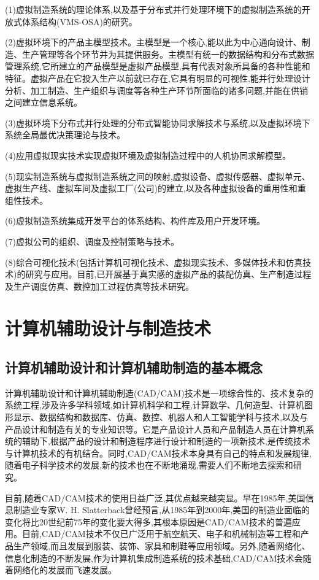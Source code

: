 \documentclass[UTF8]{ctexbook}
\newcommand{\◎}{\ensuremath{\bigcirc}}
\begin{document}
(1)虚拟制造系统的理论体系,以及基于分布式并行处理环境下的虚拟制造系统的开放式体系结构(VMS-OSA)的研究。

(2)虚拟环境下的产品主模型技术。主模型是一个核心,能以此为中心通向设计、制造、生产管理等各个环节并为其提供服务。主模型有统一的数据结构和分布式数据管理系统,它所建立的产品模型是虚拟产品模型,具有代表对象所具备的各种性能和特征。虚拟产品在它投入生产以前就已存在,它具有明显的可视性,能并行处理设计分析、加工制造、生产组织与调度等各种生产环节所面临的诸多问题,并能在供销之间建立信息系统。

(3)虚拟环境下分布式并行处理的分布式智能协同求解技术与系统,以及虚拟环境下系统全局最优决策理论与技术。

(4)应用虚拟现实技术实现虚拟环境及虚拟制造过程中的人机协同求解模型。

(5)现实制造系统与虚拟制造系统之间的映射,虚拟设备、虚拟传感器、虚拟单元、虚拟生产线、虚拟车间及虚拟工厂(公司)的建立,以及各种虚拟设备的重用性和重组性技术。

(6)虚拟制造系统集成开发平台的体系结构、构件库及用户开发环境。

(7)虚拟公司的组织、调度及控制策略与技术。

(8)综合可视化技术(包括计算机可视化技术、虚拟现实技术、多媒体技术和仿真技术)的研究与应用。目前,已开展基于真实感的虚拟产品的装配仿真、生产制造过程及生产调度仿真、数控加工过程仿真等技术研究。


\section{计算机辅助设计与制造技术}
\subsection{计算机辅助设计和计算机辅助制造的基本概念}
计算机辅助设计和计算机辅助制造(CAD/CAM)技术是一项综合性的、技术复杂的系统工程,涉及许多学科领域,如计算机科学和工程,计算数学、几何造型、计算机图形显示、数据结构和数据库、仿真、数控、机器人和人工智能学科与技术,以及与产品设计和制造有关的专业知识等。它是产品设计人员和产品制造人员在计算机系统的辅助下,根据产品的设计和制造程序进行设计和制造的一项新技术,是传统技术与计算机技术的有机结合。同时,CAD/CAM技术本身具有自己的特点和发展规律,随着电子科学技术的发展,新的技术也在不断地涌现,需要人们不断地去探索和研究。

目前,随着CAD/CAM技术的使用日益广泛,其优点越来越突显。早在1985年,美国信息制造业专家W. H. Slatterback曾经预言,从1985年到2000年,美国的制造业面临的变化将比20世纪前75年的变化要大得多,其根本原因是CAD/CAM技术的普遍应用。目前,CAD/CAM技术不仅已广泛用于航空航天、电子和机械制造等工程和产品生产领域,而且发展到服装、装饰、家具和制鞋等应用领域。另外,随着网络化、信息化制造的不断发展,作为计算机集成制造系统的技术基础,CAD/CAM技术会随着网络化的发展而飞速发展。
\end{document}
